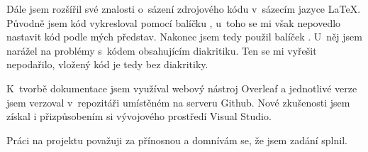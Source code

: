 \documentclass[11pt,a4paper]{report}
\begin{document}
	Dále jsem rozšířil své znalosti o~sázení zdrojového kódu v~sázecím jazyce \LaTeX. Původně jsem kód vykresloval pomocí balíčku , u~toho se mi však nepovedlo nastavit kód podle mých představ. Nakonec jsem tedy použil balíček . U~něj jsem narážel na problémy s~kódem obsahujícím diakritiku. Ten se mi vyřešit nepodařilo, vložený kód je tedy bez diakritiky.
	
	K~tvorbě dokumentace jsem využíval webový nástroj Overleaf a jednotlivé verze jsem verzoval v~repozitáři umístěném na serveru Github. Nové zkušenosti jsem získal i přizpůsobením si vývojového prostředí Visual Studio.
	
	Práci na projektu považuji za přínosnou a domnívám se, že jsem zadání splnil.

	\nocite{dokumentace}
	\nocite{medium}
	\nocite{citace}
	\nocite{Historie_pi}
	\nocite{wiki:pi}
	\nocite{zvyrazneni_kodu}
	\nocite{clisting}
	\nocite{aproximace_pi}
	\printbibliography[title={Seznam použité literatury},heading={bibintoc}]
	
	
	\clearpage
	\listoffigures
	
	\clearpage
	\lstlistoflistings

	
	
	
\end{document}
